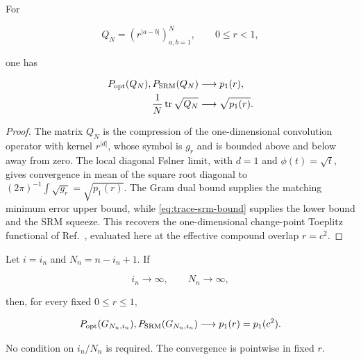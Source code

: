\begin{lemma}
For

\[
Q_N=(r^{|a-b|})_{a,b=1}^N,
\qquad 0\le r<1,
\]

one has

\begin{align}\label{eq:one-change-limit}
P_{\rm opt}(Q_N),P_{\rm SRM}(Q_N)
&\longrightarrow p_1(r), \notag\\
\frac1N\operatorname{tr}\sqrt{Q_N}
&\longrightarrow\sqrt{p_1(r)}.
\end{align}
\end{lemma}

\begin{proof}
The matrix \(Q_N\) is the compression of the one-dimensional convolution
operator with kernel \(r^{|d|}\), whose symbol is \(g_r\) and is bounded above
and below away from zero. The local diagonal Følner limit, with \(d=1\) and
\(\phi(t)=\sqrt t\), gives convergence in mean of the square root diagonal to
\((2\pi)^{-1}\int\sqrt{g_r}=\sqrt{p_1(r)}\). The Gram dual bound
supplies the matching minimum error upper bound, while
\eqref{eq:trace-srm-bound} supplies the lower bound and the SRM squeeze. This
recovers the one-dimensional change-point Toeplitz functional of
Ref.~\cite{sentis2016}, evaluated here at the effective compound overlap
\(r=c^2\).
\end{proof}

\begin{theorem}\label{thm:long-known}
Let \(i=i_n\) and \(N_n=n-i_n+1\). If

\begin{equation}\label{eq:long-known-conditions}
i_n\to\infty,\qquad N_n\to\infty,
\end{equation}

then, for every fixed \(0\le r\le1\),

\begin{equation}\label{eq:long-known-limit}
P_{\rm opt}(G_{N_n,i_n}),
P_{\rm SRM}(G_{N_n,i_n})
\longrightarrow p_1(r)=p_1(c^2).
\end{equation}

No condition on \(i_n/N_n\) is required.
The convergence is pointwise in fixed \(r\).
\end{theorem}

